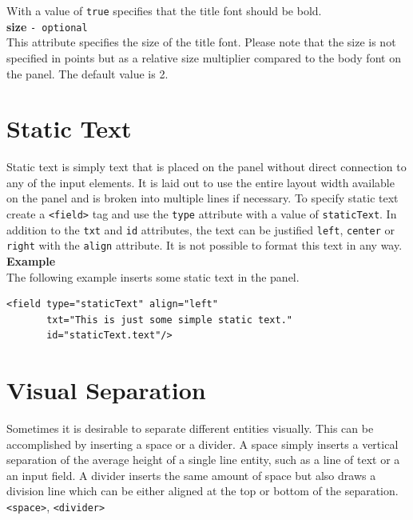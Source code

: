With a value of \texttt{true} specifies that the title font should be bold.\\

\textbf{size} \texttt{- optional}\\

This attribute specifies the size of the title font. Please note that
the size is not specified in points but as a relative size multiplier
compared to the body font on the panel. The default value is 2.\\

\section{Static Text}

Static text is simply text that is placed on the panel without direct
connection to any of the input elements. It is laid out to use the
entire layout width available on the panel and is broken into multiple
lines if necessary. To specify static text create a \texttt{<field>} tag
and use the \texttt{type} attribute with a value of \texttt{staticText}.
In addition to the \texttt{txt} and \texttt{id} attributes, the text can
be justified \texttt{left}, \texttt{center} or \texttt{right} with the
\texttt{align} attribute. It is not possible to format this text in any way.\\

\textbf{Example}\\

The following example inserts some static text in the panel.

\footnotesize
\begin{verbatim}
<field type="staticText" align="left" 
       txt="This is just some simple static text."
       id="staticText.text"/>
\end{verbatim}
\normalsize

\section{Visual Separation}

Sometimes it is desirable to separate different entities visually. This
can be accomplished by inserting a space or a divider. A space simply
inserts a vertical separation of the average height of a single line
entity, such as a line of text or a an input field. A divider inserts
the same amount of space but also draws a division line which can be
either aligned at the top or bottom of the separation.
\texttt{<space>}, \texttt{<divider>}

